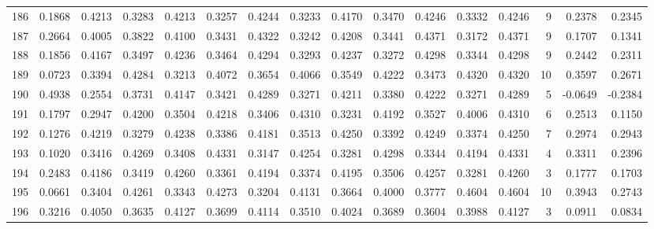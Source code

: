 \begin{tabular}{lrrrrrrrrrrrrrrr}
186 &      0.1868 &  0.4213 &  0.3283 &  0.4213 &  0.3257 &  0.4244 &  0.3233 &  0.4170 &  0.3470 &  0.4246 &   0.3332 &     0.4246 &      9 &                    0.2378 &                     0.2345 \\
187 &      0.2664 &  0.4005 &  0.3822 &  0.4100 &  0.3431 &  0.4322 &  0.3242 &  0.4208 &  0.3441 &  0.4371 &   0.3172 &     0.4371 &      9 &                    0.1707 &                     0.1341 \\
188 &      0.1856 &  0.4167 &  0.3497 &  0.4236 &  0.3464 &  0.4294 &  0.3293 &  0.4237 &  0.3272 &  0.4298 &   0.3344 &     0.4298 &      9 &                    0.2442 &                     0.2311 \\
189 &      0.0723 &  0.3394 &  0.4284 &  0.3213 &  0.4072 &  0.3654 &  0.4066 &  0.3549 &  0.4222 &  0.3473 &   0.4320 &     0.4320 &     10 &                    0.3597 &                     0.2671 \\
190 &      0.4938 &  0.2554 &  0.3731 &  0.4147 &  0.3421 &  0.4289 &  0.3271 &  0.4211 &  0.3380 &  0.4222 &   0.3271 &     0.4289 &      5 &                   -0.0649 &                    -0.2384 \\
191 &      0.1797 &  0.2947 &  0.4200 &  0.3504 &  0.4218 &  0.3406 &  0.4310 &  0.3231 &  0.4192 &  0.3527 &   0.4006 &     0.4310 &      6 &                    0.2513 &                     0.1150 \\
192 &      0.1276 &  0.4219 &  0.3279 &  0.4238 &  0.3386 &  0.4181 &  0.3513 &  0.4250 &  0.3392 &  0.4249 &   0.3374 &     0.4250 &      7 &                    0.2974 &                     0.2943 \\
193 &      0.1020 &  0.3416 &  0.4269 &  0.3408 &  0.4331 &  0.3147 &  0.4254 &  0.3281 &  0.4298 &  0.3344 &   0.4194 &     0.4331 &      4 &                    0.3311 &                     0.2396 \\
194 &      0.2483 &  0.4186 &  0.3419 &  0.4260 &  0.3361 &  0.4194 &  0.3374 &  0.4195 &  0.3506 &  0.4257 &   0.3281 &     0.4260 &      3 &                    0.1777 &                     0.1703 \\
195 &      0.0661 &  0.3404 &  0.4261 &  0.3343 &  0.4273 &  0.3204 &  0.4131 &  0.3664 &  0.4000 &  0.3777 &   0.4604 &     0.4604 &     10 &                    0.3943 &                     0.2743 \\
196 &      0.3216 &  0.4050 &  0.3635 &  0.4127 &  0.3699 &  0.4114 &  0.3510 &  0.4024 &  0.3689 &  0.3604 &   0.3988 &     0.4127 &      3 &                    0.0911 &                     0.0834 \\

\end{tabular}
